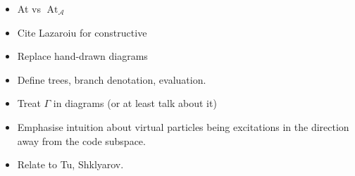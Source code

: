 \documentclass[english,letter paper,12pt,leqno]{article}
\theoremstyle{example}
\numberwithin{equation}{section}
\def\AA{\mathcal{A}}
\DeclareMathOperator{\vAt}{At}
\begin{document}
\begin{itemize}



\item At vs $\vAt_{\AA}$

\item Cite Lazaroiu for constructive

\item Replace hand-drawn diagrams

\item Define trees, branch denotation, evaluation.

\item Treat $\Gamma$ in diagrams (or at least talk about it)

\item Emphasise intuition about virtual particles being excitations in the direction away from the code subspace.

\item Relate to Tu, Shklyarov.






\end{itemize}
\end{document}
